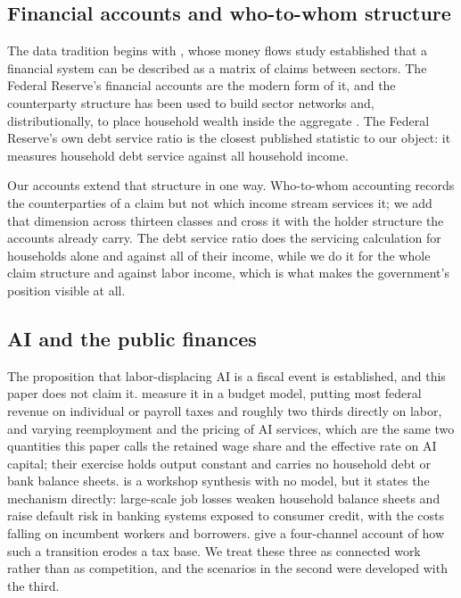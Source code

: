 \subsection{Financial accounts and who-to-whom structure}

The data tradition begins with \citet{Copeland1952}, whose money flows study established that a
financial system can be described as a matrix of claims between sectors. The Federal Reserve's
financial accounts \citep{FRBZ1} are the modern form of it, and the counterparty structure has
been used to build sector networks \citep{CastrenRancan2014} and, distributionally, to place
household wealth inside the aggregate \citep{BattyEtAl2019}. The Federal Reserve's own debt
service ratio is the closest published statistic to our object: it measures household debt
service against all household income.

Our accounts extend that structure in one way. Who-to-whom accounting records the counterparties
of a claim but not which income stream services it; we add that dimension across thirteen classes
and cross it with the holder structure the accounts already carry. The debt service ratio does the
servicing calculation for households alone and against all of their income, while we do it for the
whole claim structure and against labor income, which is what makes the government's position
visible at all.

\subsection{AI and the public finances}

The proposition that labor-displacing AI is a fiscal event is established, and this paper does not
claim it. \citet{PriceSuresh2026} measure it in a budget model, putting most federal revenue on
individual or payroll taxes and roughly two thirds directly on labor, and varying reemployment
and the pricing of AI services, which are the same two quantities this paper calls the retained
wage share and the effective rate on AI capital; their exercise holds output constant and carries
no household debt or bank balance sheets. \citet{Barhoumi2026} is a workshop synthesis with no
model, but it states the mechanism directly: large-scale job losses weaken household balance
sheets and raise default risk in banking systems exposed to consumer credit, with the costs
falling on incumbent workers and borrowers. \citet{IeongSaputraManiarCheng2026} give a
four-channel account of how such a transition erodes a tax base. We treat these three as
connected work rather than as competition, and the scenarios in the second were developed with
the third.

